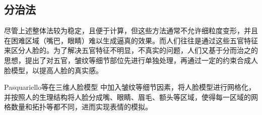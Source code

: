 \documentclass{ctexart}
\begin{document}
\subsection{\hei 分治法}
尽管上述整体法较为稳定，且便于计算，但这些方法通常不允许细粒度变形，并且在困难区域（嘴巴，眼睛）难以生成逼真的效果。而人们往往是通过这些五官特征来区分人脸的。为了解决五官特征不明显，不真实的问题，人们又基于分而治之的思想，提出了对五官，皱纹等细节部位先进行单独处理，再通过一定的约束合成人脸模型，以提高人脸的真实感。\par
Pasquariello等\cite{6}在三维人脸模型 中加入皱纹等细节因素，将人脸模型进行网格化，并按照人的生理结构将人脸分成嘴、眼睛、眉毛、额头等区域，使得每一区域的网格数量和拓扑等都不同，进而实现表情的模拟。\par
\begin{figure}[htbp]	
	\centering	
\end{figure}
\end{document}
